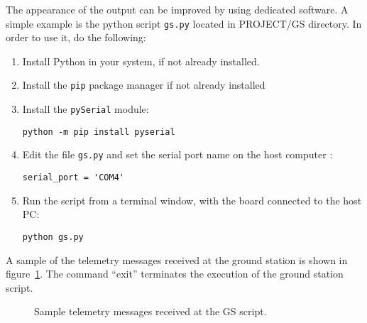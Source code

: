 The appearance of the output can be improved by using dedicated software. A simple example is the python script {\tt gs.py} located in PROJECT/GS directory. In order to use it, do the following:
\begin{enumerate}
\item Install Python in your system, if not already installed.
\item Install the {\tt pip} package manager if not already installed
\item Install the {\tt pySerial} module:
\begin{verbatim}
python -m pip install pyserial
\end{verbatim}
\item Edit the file {\tt gs.py} and set the serial port name on the host computer :
\begin{verbatim}
serial_port = 'COM4'
\end{verbatim}

\item Run the script from a terminal window, with the board connected to the host PC:
\begin{verbatim}
python gs.py
\end{verbatim}
\end{enumerate}
A sample of the telemetry messages received at the ground station is shown in figure~\ref{fig:gs-output}. The command ``exit'' terminates the execution of the ground station script.

\begin{figure}[hbt!]
            \caption{Sample telemetry messages received at the GS script.}
            \label{fig:gs-output}
\end{figure}
